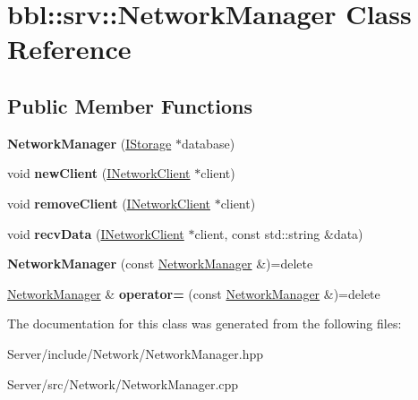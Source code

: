 \hypertarget{classbbl_1_1srv_1_1_network_manager}{}\section{bbl\+:\+:srv\+:\+:Network\+Manager Class Reference}
\label{classbbl_1_1srv_1_1_network_manager}
\subsection*{Public Member Functions}
\begin{DoxyCompactItemize}
\item 
\mbox{\label{classbbl_1_1srv_1_1_network_manager_a0eef19acc78e74b6d05e26cce6985c84}} 
{\bfseries Network\+Manager} (\hyperlink{classbbl_1_1srv_1_1_i_storage}{I\+Storage} $\ast$database)
\item 
\mbox{\label{classbbl_1_1srv_1_1_network_manager_a1cf6832dd4e67937f407e230db86bfa4}} 
void {\bfseries new\+Client} (\hyperlink{classbbl_1_1srv_1_1_i_network_client}{I\+Network\+Client} $\ast$client)
\item 
\mbox{\label{classbbl_1_1srv_1_1_network_manager_a62b74532f1ffd1882460ac8c4dcc56ba}} 
void {\bfseries remove\+Client} (\hyperlink{classbbl_1_1srv_1_1_i_network_client}{I\+Network\+Client} $\ast$client)
\item 
\mbox{\label{classbbl_1_1srv_1_1_network_manager_a77a7757450eef7c970673e615ea14e1b}} 
void {\bfseries recv\+Data} (\hyperlink{classbbl_1_1srv_1_1_i_network_client}{I\+Network\+Client} $\ast$client, const std\+::string \&data)
\item 
\mbox{\label{classbbl_1_1srv_1_1_network_manager_a338ea0d2cc3a1db5f72bc1f1e778e5f3}} 
{\bfseries Network\+Manager} (const \hyperlink{classbbl_1_1srv_1_1_network_manager}{Network\+Manager} \&)=delete
\item 
\mbox{\label{classbbl_1_1srv_1_1_network_manager_a33772329a1bcbe58e560ead6ac8677d4}} 
\hyperlink{classbbl_1_1srv_1_1_network_manager}{Network\+Manager} \& {\bfseries operator=} (const \hyperlink{classbbl_1_1srv_1_1_network_manager}{Network\+Manager} \&)=delete
\end{DoxyCompactItemize}


The documentation for this class was generated from the following files\+:\begin{DoxyCompactItemize}
\item 
Server/include/\+Network/Network\+Manager.\+hpp\item 
Server/src/\+Network/Network\+Manager.\+cpp\end{DoxyCompactItemize}
